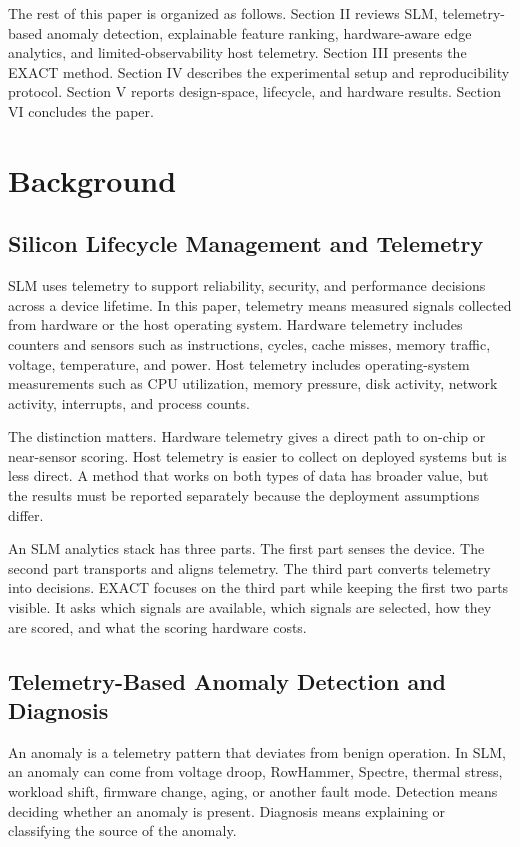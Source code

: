 The rest of this paper is organized as follows. Section II reviews SLM, telemetry-based anomaly detection, explainable feature ranking, hardware-aware edge analytics, and limited-observability host telemetry. Section III presents the EXACT method. Section IV describes the experimental setup and reproducibility protocol. Section V reports design-space, lifecycle, and hardware results. Section VI concludes the paper.

\section{Background}

\subsection{Silicon Lifecycle Management and Telemetry}

SLM uses telemetry to support reliability, security, and performance decisions across a device lifetime. In this paper, telemetry means measured signals collected from hardware or the host operating system. Hardware telemetry includes counters and sensors such as instructions, cycles, cache misses, memory traffic, voltage, temperature, and power. Host telemetry includes operating-system measurements such as CPU utilization, memory pressure, disk activity, network activity, interrupts, and process counts.

The distinction matters. Hardware telemetry gives a direct path to on-chip or near-sensor scoring. Host telemetry is easier to collect on deployed systems but is less direct. A method that works on both types of data has broader value, but the results must be reported separately because the deployment assumptions differ.

An SLM analytics stack has three parts. The first part senses the device. The second part transports and aligns telemetry. The third part converts telemetry into decisions. EXACT focuses on the third part while keeping the first two parts visible. It asks which signals are available, which signals are selected, how they are scored, and what the scoring hardware costs.

\subsection{Telemetry-Based Anomaly Detection and Diagnosis}

An anomaly is a telemetry pattern that deviates from benign operation. In SLM, an anomaly can come from voltage droop, RowHammer, Spectre, thermal stress, workload shift, firmware change, aging, or another fault mode. Detection means deciding whether an anomaly is present. Diagnosis means explaining or classifying the source of the anomaly.


